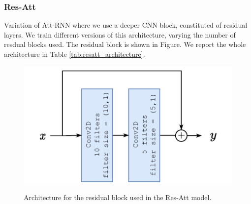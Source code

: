 \subsubsection{\textbf{Res-Att}}
Variation of Att-RNN where we use a deeper CNN block, constituted of residual layers.  We train different versions of this architecture, varying the number of resdual blocks used. The residual block is shown in Figure. We report the whole architecture in Table \ref{tab:resatt_architecture}. 

\begin{figure}
	\centering
	\includegraphics[width=0.9\linewidth]{imgs/residual_block.pdf}
	\label{fig:resblock}
	\caption{Architecture for the residual block used in the Res-Att model.}
\end{figure}

\begin{table}[h!]
	\centering
	\caption{Res-Att$k$ architecture, where $k$ is the number of residual blocks.}
	\label{tab:resatt_architecture}
\end{table}


